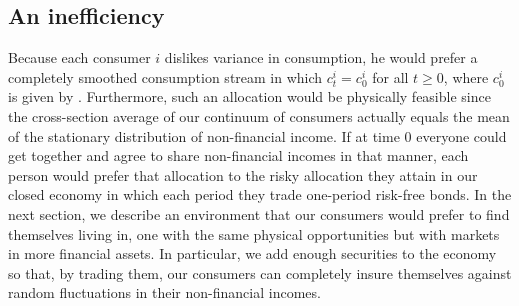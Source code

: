 


\subsection{An inefficiency}
Because each consumer $i$ dislikes variance in consumption, he would prefer a completely smoothed   consumption stream  in which $c^i_t = c^i_0$ for all $t \geq 0$, where
$c^i_0$ is given by .
Furthermore, such an allocation 
would be physically feasible since the cross-section average of our continuum of consumers actually equals the mean of the
stationary distribution of non-financial income.
If at time $0$ everyone could get together and agree to
share  non-financial incomes in that manner, each 
person would prefer that allocation to the 
risky allocation they attain in our closed economy in which each period they trade one-period risk-free bonds.   In the next section, we describe an environment that our consumers would prefer to find themselves living in, one  with the same physical opportunities but with markets in more financial assets.  In particular, we add enough securities to the economy so that, by trading them, our consumers can  completely insure themselves against random 
fluctuations in their non-financial incomes. 






%
%
